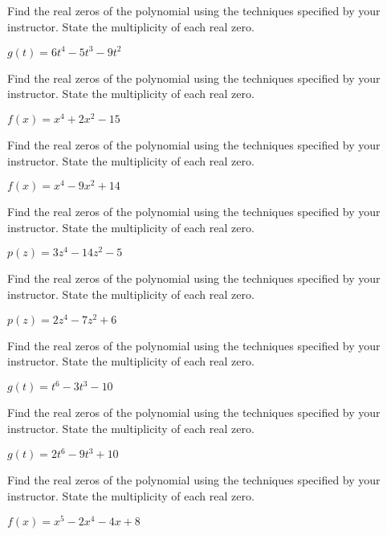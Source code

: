 \documentclass{ximera}
\begin{document}
\begin{problem}
Find the real zeros of the polynomial using the techniques specified by your instructor.  State the multiplicity of each real zero.

$g(t) = 6t^{4} - 5t^{3} - 9t^{2}$
\end{problem}

\begin{problem}
Find the real zeros of the polynomial using the techniques specified by your instructor.  State the multiplicity of each real zero.

$f(x) = x^4+2x^2 - 15$
\end{problem}

\begin{problem}
Find the real zeros of the polynomial using the techniques specified by your instructor.  State the multiplicity of each real zero.

$f(x) = x^4-9x^2+14$
\end{problem}

\begin{problem}
Find the real zeros of the polynomial using the techniques specified by your instructor.  State the multiplicity of each real zero.

$p(z) = 3z^4-14z^2-5$
\end{problem}

\begin{problem}
Find the real zeros of the polynomial using the techniques specified by your instructor.  State the multiplicity of each real zero.

$p(z) = 2z^4-7z^2+6$
\end{problem}

\begin{problem}
Find the real zeros of the polynomial using the techniques specified by your instructor.  State the multiplicity of each real zero.

$g(t) = t^6-3t^3-10$
\end{problem}

\begin{problem}
Find the real zeros of the polynomial using the techniques specified by your instructor.  State the multiplicity of each real zero.

$g(t) = 2t^6-9t^3+10$
\end{problem}

\begin{problem}
Find the real zeros of the polynomial using the techniques specified by your instructor.  State the multiplicity of each real zero.

$f(x) = x^5-2x^4-4x+8$
\end{problem}
\end{document}
